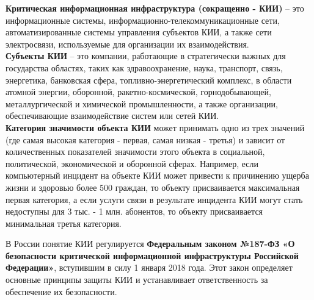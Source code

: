 \documentclass[a4paper, 14pt]{report}
\begin{document}
\begin{tcolorbox}[colback=white!95!gray, colframe=teal, title=Определения]
    \textbf{Критическая информационная инфраструктура (сокращенно - КИИ)} – это информационные системы, информационно-телекоммуникационные сети, автоматизированные системы управления субъектов КИИ, а также сети электросвязи, используемые для организации их взаимодействия.\\

    \textbf{Субъекты КИИ} – это компании, работающие в стратегически важных для государства областях, таких как здравоохранение, наука, транспорт, связь, энергетика, банковская сфера, топливно-энергетический комплекс, в области атомной энергии, оборонной, ракетно-космической, горнодобывающей, металлургической и химической промышленности, а также организации, обеспечивающие взаимодействие систем или сетей КИИ.\\

    \textbf{Категория значимости объекта КИИ} может принимать одно из трех значений (где самая высокая категория - первая, самая низкая - третья) и зависит от количественных показателей значимости этого объекта в социальной, политической, экономической и оборонной сферах. Например, если компьютерный инцидент на объекте КИИ может привести к причинению ущерба жизни и здоровью более 500 граждан, то объекту присваивается максимальная первая категория, а если услуги связи в результате инцидента КИИ могут стать недоступны для 3 тыс. - 1 млн. абонентов, то объекту присваивается минимальная третья категория.
\end{tcolorbox}

В России понятие КИИ регулируется \textbf{Федеральным законом №187-ФЗ «О безопасности критической информационной инфраструктуры Российской Федерации»}, вступившим в силу 1 января 2018 года. Этот закон определяет основные принципы защиты КИИ и устанавливает ответственность за обеспечение их безопасности\cite{securityvision}.
\end{document}
